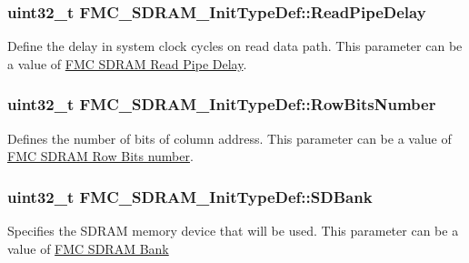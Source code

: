 \subsubsection[{\texorpdfstring{Read\+Pipe\+Delay}{ReadPipeDelay}}]{\setlength{\rightskip}{0pt plus 5cm}uint32\+\_\+t F\+M\+C\+\_\+\+S\+D\+R\+A\+M\+\_\+\+Init\+Type\+Def\+::\+Read\+Pipe\+Delay}\hypertarget{struct_f_m_c___s_d_r_a_m___init_type_def_a3513cfd5140bd410cef2f0015c5a3733}{}\label{struct_f_m_c___s_d_r_a_m___init_type_def_a3513cfd5140bd410cef2f0015c5a3733}
Define the delay in system clock cycles on read data path. This parameter can be a value of \hyperlink{group___f_m_c___s_d_r_a_m___read___pipe___delay}{F\+MC S\+D\+R\+AM Read Pipe Delay}. 
\subsubsection[{\texorpdfstring{Row\+Bits\+Number}{RowBitsNumber}}]{\setlength{\rightskip}{0pt plus 5cm}uint32\+\_\+t F\+M\+C\+\_\+\+S\+D\+R\+A\+M\+\_\+\+Init\+Type\+Def\+::\+Row\+Bits\+Number}\hypertarget{struct_f_m_c___s_d_r_a_m___init_type_def_a8a7f54fd1e3b04c566a76b774d00adda}{}\label{struct_f_m_c___s_d_r_a_m___init_type_def_a8a7f54fd1e3b04c566a76b774d00adda}
Defines the number of bits of column address. This parameter can be a value of \hyperlink{group___f_m_c___s_d_r_a_m___row___bits__number}{F\+MC S\+D\+R\+AM Row Bits number}. 
\subsubsection[{\texorpdfstring{S\+D\+Bank}{SDBank}}]{\setlength{\rightskip}{0pt plus 5cm}uint32\+\_\+t F\+M\+C\+\_\+\+S\+D\+R\+A\+M\+\_\+\+Init\+Type\+Def\+::\+S\+D\+Bank}\hypertarget{struct_f_m_c___s_d_r_a_m___init_type_def_aea667abcdef2269338f2172c9b23e0be}{}\label{struct_f_m_c___s_d_r_a_m___init_type_def_aea667abcdef2269338f2172c9b23e0be}
Specifies the S\+D\+R\+AM memory device that will be used. This parameter can be a value of \hyperlink{group___f_m_c___s_d_r_a_m___bank}{F\+MC S\+D\+R\+AM Bank} 
